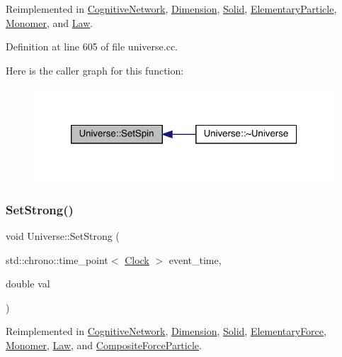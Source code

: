 Reimplemented in \hyperlink{class_cognitive_network_a3fc6d08413bfd4350f94d6f2627eedc7}{Cognitive\+Network}, \hyperlink{class_dimension_a8d73c050c67b0226572b4a1b08ae6594}{Dimension}, \hyperlink{class_solid_a615cb8d1ec1376781726bcefa86339cb}{Solid}, \hyperlink{class_elementary_particle_a437fa86d88157314b84662b158d52353}{Elementary\+Particle}, \hyperlink{class_monomer_ad24a86a4c1ac62d1b0ce8040d6b08adf}{Monomer}, and \hyperlink{class_law_a3de75edea5e20db0a7b731de61f07dea}{Law}.



Definition at line 605 of file universe.\+cc.

Here is the caller graph for this function\+:
\nopagebreak
\begin{figure}[H]
\begin{center}
\leavevmode
\includegraphics[width=320pt]{class_universe_ae2ae1c3b3e4cde2c18f5f6a814761ec8_icgraph}
\end{center}
\end{figure}
\mbox{\label{class_universe_a5946c8f3d4cda305f3ecd10df21a2f94}} 
\subsubsection{\texorpdfstring{Set\+Strong()}{SetStrong()}}
{\footnotesize\ttfamily void Universe\+::\+Set\+Strong (\begin{DoxyParamCaption}\item[{std\+::chrono\+::time\+\_\+point$<$ \hyperlink{universe_8h_a0ef8d951d1ca5ab3cfaf7ab4c7a6fd80}{Clock} $>$}]{event\+\_\+time,  }\item[{double}]{val }\end{DoxyParamCaption})\hspace{0.3cm}{\ttfamily [virtual]}}



Reimplemented in \hyperlink{class_cognitive_network_a50f2a12c9873e623d6247318b041ba30}{Cognitive\+Network}, \hyperlink{class_dimension_ab9021cb6727ed590026bf870c638576d}{Dimension}, \hyperlink{class_solid_a478e15cdf15c5bb01cbcbd5f584ef83a}{Solid}, \hyperlink{class_elementary_force_aa1b5708cfab2069049fec5c924e1f246}{Elementary\+Force}, \hyperlink{class_monomer_a10b864f6bcad43f11a2316dbbe4c4742}{Monomer}, \hyperlink{class_law_a4cd0dd1908edbd02090dd1ba1387d722}{Law}, and \hyperlink{class_composite_force_particle_a06488ef0457335648b161d3ed746b643}{Composite\+Force\+Particle}.



